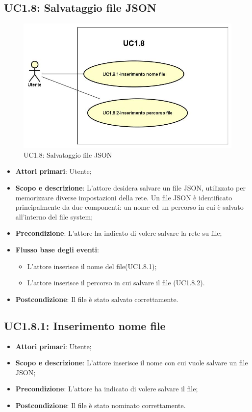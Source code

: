 \subsection{UC1.8: Salvataggio file JSON} 
\hypertarget{UC1.8}{} 
\begin{figure} [H]
	\centering
	\includegraphics[scale=0.45]{Img/UC1-8} 
	\caption{UC1.8: Salvataggio file JSON} \label{} 
\end{figure} 
\begin{itemize} 
	\item{\textbf{Attori primari}: Utente;} 
	\item{\textbf{Scopo e descrizione}: L'attore desidera salvare un file JSON, utilizzato per memorizzare diverse impostazioni della rete. Un file JSON è identificato principalmente da due componenti: un nome ed un percorso in cui è salvato all'interno del file system;} 
	\item{\textbf{Precondizione}: L'attore ha indicato di volere salvare la rete su file;} 
	\item{\textbf{Flusso base degli eventi}: } 
	\begin{itemize} 
		\item{L'attore inserisce il nome del file(UC1.8.1);} 
		\item{L'attore inserisce il percorso in cui salvare il file (UC1.8.2).} 
	\end{itemize} 
	\item{\textbf{Postcondizione}: Il file è stato salvato correttamente.} 
\end{itemize} 
\subsection{UC1.8.1: Inserimento nome file} 
\hypertarget{UC1.8.1}{} 
\begin{itemize} 
	\item{\textbf{Attori primari}: Utente;} 
	\item{\textbf{Scopo e descrizione}: L'attore inserisce il nome con cui vuole salvare un file JSON;} 
	\item{\textbf{Precondizione}: L'attore ha indicato di volere salvare il file;} 
	\item{\textbf{Postcondizione}: Il file è stato nominato correttamente.} 
\end{itemize} 
